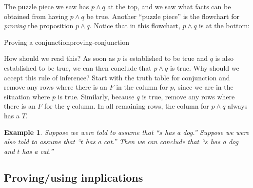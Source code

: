 \documentclass{book}
\newcounter{ekcounter}%
\theoremstyle{ekimcustom}
\newtheorem{example}[ekcounter]{Example}
\begin{document}
The puzzle piece we saw has $p \wedge q$ at the top, and we saw what facts can be obtained from having $p \wedge q$ be true. Another ``puzzle piece'' is the flowchart for \emph{proving} the proposition $p \wedge q$. Notice that in this flowchart, $p \wedge q$ is at the bottom:
\begin{bmethod}{Proving a conjunction}{proving-conjunction}
\begin{center}
\end{center}
\end{bmethod}
How should we read this? As soon as $p$ is established to be true and $q$ is also established to be true, we can then conclude that $p \wedge q$ is true. Why should we accept this rule of inference? Start with the truth table for conjunction and remove any rows where there is an $F$ in the column for $p$, since we are in the situation where $p$ is true. Similarly, because $q$ is true, remove any rows where there is an $F$ for the $q$ column. In all remaining rows, the column for $p \wedge q$ always has a $T$.
\begin{example}
Suppose we were told to assume that ``$s$ has a dog.'' Suppose we were also told to assume that ``$t$ has a cat.'' Then we can conclude that ``$s$ has a dog and $t$ has a cat.''
\end{example}

\subsection{Proving/using implications}\label{section:proving-using-implication}
\end{document}
